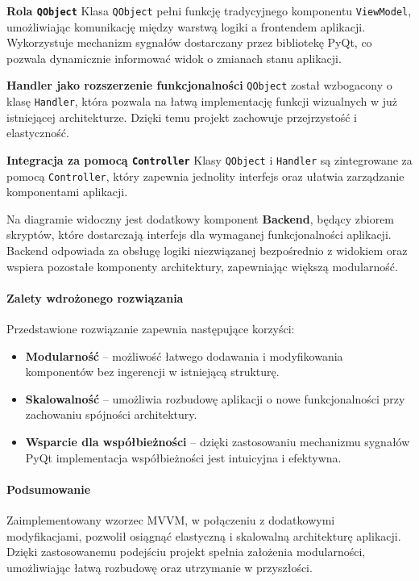 \textbf{Rola \texttt{QObject}}
Klasa \texttt{QObject} pełni funkcję tradycyjnego komponentu \texttt{ViewModel}, umożliwiając komunikację między warstwą logiki a frontendem aplikacji. Wykorzystuje mechanizm sygnałów dostarczany przez bibliotekę PyQt, co pozwala dynamicznie informować widok o zmianach stanu aplikacji.

\textbf{Handler jako rozszerzenie funkcjonalności}
\texttt{QObject} został wzbogacony o klasę \texttt{Handler}, która pozwala na łatwą implementację funkcji wizualnych w już istniejącej architekturze. Dzięki temu projekt zachowuje przejrzystość i elastyczność.

\textbf{Integracja za pomocą \texttt{Controller}}
Klasy \texttt{QObject} i \texttt{Handler} są zintegrowane za pomocą \texttt{Controller}, który zapewnia jednolity interfejs oraz ułatwia zarządzanie komponentami aplikacji.

Na diagramie widoczny jest dodatkowy komponent \textbf{Backend}, będący zbiorem skryptów, które dostarczają interfejs dla wymaganej funkcjonalności aplikacji. Backend odpowiada za obsługę logiki niezwiązanej bezpośrednio z widokiem oraz wspiera pozostałe komponenty architektury, zapewniając większą modularność.

\paragraph{Zalety wdrożonego rozwiązania}
Przedstawione rozwiązanie zapewnia następujące korzyści:
\begin{itemize}
    \item \textbf{Modularność} -- możliwość łatwego dodawania i modyfikowania komponentów bez ingerencji w istniejącą strukturę.
    \item \textbf{Skalowalność} -- umożliwia rozbudowę aplikacji o nowe funkcjonalności przy zachowaniu spójności architektury.
    \item \textbf{Wsparcie dla współbieżności} -- dzięki zastosowaniu mechanizmu sygnałów PyQt implementacja współbieżności jest intuicyjna i efektywna.
\end{itemize}

\paragraph{Podsumowanie}
Zaimplementowany wzorzec MVVM, w połączeniu z dodatkowymi modyfikacjami, pozwolił osiągnąć elastyczną i skalowalną architekturę aplikacji. Dzięki zastosowanemu podejściu projekt spełnia założenia modularności, umożliwiając łatwą rozbudowę oraz utrzymanie w przyszłości.